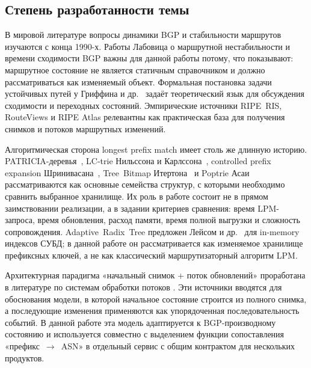 \subsection*{Степень разработанности темы}

В мировой литературе вопросы динамики BGP и стабильности маршрутов
изучаются с конца 1990-х. Работы Лабовица о маршрутной нестабильности и
времени сходимости BGP
\cite{labovitz1997instability,labovitz2000convergence} важны для данной
работы потому, что показывают: маршрутное состояние не является
статичным справочником и должно рассматриваться как изменяемый объект.
Формальная постановка задачи устойчивых путей у Гриффина и
др.~\cite{griffin2002stablepaths} задаёт теоретический язык для
обсуждения сходимости и переходных состояний. Эмпирические источники
RIPE~RIS, RouteViews и RIPE Atlas
\cite{ripe-ris,routeviews,ripe-beacons} релевантны как практическая база
для получения снимков и потоков маршрутных изменений.

Алгоритмическая сторона longest prefix match имеет столь же длинную
историю. PATRICIA-деревья~\cite{morrison1968patricia}, LC-trie
Нильссона и Карлссона~\cite{nilsson1999lctries}, controlled prefix
expansion Шринивасана~\cite{srinivasan1999prefixexpansion},
Tree~Bitmap Итертона~\cite{eatherton2004treebitmap} и Poptrie
Асаи~\cite{asai2015poptrie} рассматриваются как основные семейства
структур, с которыми необходимо сравнить выбранное хранилище. Их роль в
работе состоит не в прямом заимствовании реализации, а в задании
критериев сравнения: время LPM-запроса, время обновления, расход
памяти, время полной выгрузки и сложность сопровождения.
Adaptive~Radix~Tree предложен Лейсом и др.~\cite{leis2013art} для
in-memory индексов СУБД; в данной работе он рассматривается как
изменяемое хранилище префиксных ключей, а не как классический
маршрутизаторный алгоритм LPM.

Архитектурная парадигма «начальный снимок + поток обновлений» проработана
в литературе по системам обработки потоков
\cite{kreps2011kafka,akidau2015dataflow,carbone2015flink,kleppmann2017ddia}.
Эти источники вводятся для обоснования модели, в которой начальное
состояние строится из полного снимка, а последующие изменения применяются
как упорядоченная последовательность событий. В данной работе эта модель
адаптируется к BGP-производному состоянию и используется совместно с
выделением функции сопоставления «префикс~$\rightarrow$~ASN» в отдельный
сервис с общим контрактом для нескольких продуктов.

